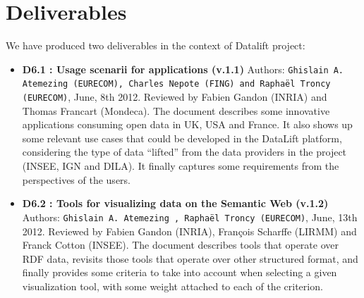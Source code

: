 \documentclass[a4paper,11pt]{report}
\begin{document}
\section*{Deliverables}
We have produced two deliverables in the context of Datalift project: 
\begin{itemize}
\item \textbf{D6.1 : Usage scenarii for applications (v.1.1)} Authors: \texttt{Ghislain A. Atemezing (EURECOM), Charles Nepote (FING) and Rapha\"{e}l Troncy (EURECOM)}, June, 8th 2012. Reviewed by Fabien Gandon (INRIA) and Thomas Francart (Mondeca). The document describes some innovative applications consuming open data in UK, USA and France. It also shows up some relevant use cases that could be developed in the DataLift platform, considering the type of data  ``lifted'' from the data providers in the project (INSEE, IGN and DILA). It finally captures some requirements from the perspectives of the users.
\item \textbf{D6.2 : Tools for visualizing data on the Semantic Web (v.1.2)} Authors: \texttt{Ghislain A. Atemezing , Rapha\"{e}l Troncy (EURECOM)}, June, 13th 2012. Reviewed by Fabien Gandon (INRIA), Fran\c cois Scharffe (LIRMM) and Franck Cotton (INSEE). The document describes tools that operate over RDF data, revisits those tools that operate over other structured format, and finally provides some criteria to take into account when selecting a given visualization tool, with some weight attached to each of the criterion.
\end{itemize}
\end{document}
